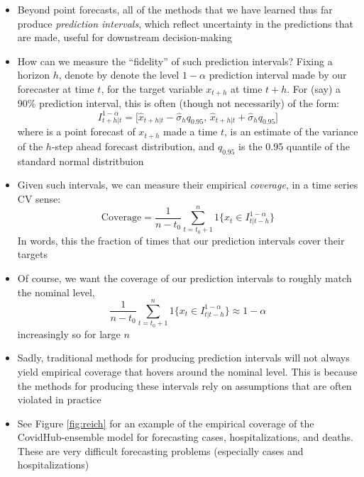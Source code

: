 \documentclass{article}
\begin{document}
\begin{itemize}
\item Beyond point forecasts, all of the methods that we have learned thus far
  produce \emph{prediction intervals}, which reflect uncertainty in the
  predictions that are made, useful for downstream decision-making   

\item How can we measure the ``fidelity'' of such prediction intervals? Fixing a
  horizon $h$, denote by  denote the level
  $1-\alpha$ prediction interval made by our forecaster at time $t$, for the
  target variable $x_{t+h}$ at time $t+h$. For (say) a 90\% prediction interval,
  this is often (though not necessarily) of the form: 
  \[
  I^{1-\alpha}_{t+h|t} = 
  \big[\hat{x}_{t+h|t} - \hat\sigma_h q_{0.95}, \, \hat{x}_{t+h|t} +  
  \hat\sigma_h q_{0.95} \big]
  \]
  where  is a point forecast of $x_{t+h}$ made a time
  $t$,  is an estimate of the variance of the $h$-step  
  ahead forecast distribution, and $q_{0.95}$ is the 0.95 quantile of the
  standard normal distritbuion  

\item Given such intervals, we can measure their empirical \emph{coverage}, in a
  time series CV sense:  
  \[
  \mathrm{Coverage} = \frac{1}{n-t_0} \sum_{t=t_0+1}^n 1\big\{ x_t \in 
  I^{1-\alpha}_{t|t-h} \big\}
  \]
  In words, this the fraction of times that our prediction intervals cover their
  targets

\item Of course, we want the coverage of our prediction intervals to roughly
  match the nominal level, 
  \[
    \frac{1}{n-t_0} \sum_{t=t_0+1}^n 1\big\{ x_t \in I^{1-\alpha}_{t|t-h} \big\}
    \approx 1-\alpha
  \]
  increasingly so for large $n$

\item Sadly, traditional methods for producing prediction intervals will not
  always yield empirical coverage that hovers around the nominal level. This is 
  because the methods for producing these intervals rely on assumptions that are
  often violated in practice

\item See Figure \ref{fig:reich} for an example of the empirical coverage of
  the CovidHub-ensemble model for forecasting cases, hospitalizations, and
  deaths. These are very difficult forecasting problems (especially cases and
  hospitalizations)    


\end{itemize}
\end{document}

